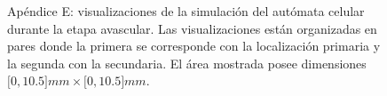 \begin{figure}[!ht]
\begin{center}
\end{center}\vspace*{-0.75cm}
\caption[Ap\'endice E: visualizaciones de la simulaci\'on del aut\'omata celular durante la etapa avascular]{Ap\'endice E: visualizaciones de la simulaci\'on del aut\'omata celular durante la etapa avascular. Las visualizaciones est\'an organizadas en pares donde la primera se corresponde con la localizaci\'on primaria y la segunda con la secundaria. El \'area mostrada posee dimensiones $[0,10$.$5]mm \times [0,10$.$5]mm$.}
\end{figure}

